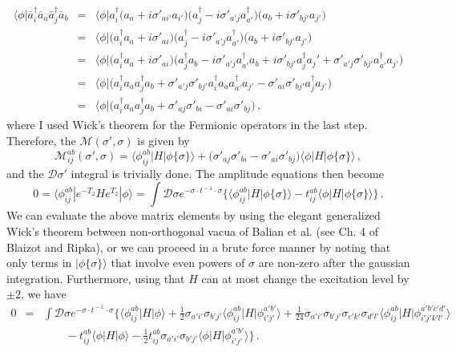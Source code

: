 \documentclass[12pt]{article}
\begin{document}
\begin{eqnarray}
\langle\phi|\bar{a}^{\dagger}_i\bar{a}_a\bar{a}^{\dagger}_j\bar{a}_b &=& \langle\phi|a^{\dagger}_i\bigl(a_a+i\sigma'_{ai'}a_{i'}\bigr)\bigl(a^{\dagger}_j - i\sigma'_{a'j}a^{\dagger}_{a'}\bigr)\bigl(a_b + i\sigma'_{bj'}a_{j'}\bigr)\\
&=& \langle\phi|\bigl(a^{\dagger}_ia_a + i\sigma'_{ai}\bigr)\bigl(a^{\dagger}_j - i\sigma'_{a'j}a^{\dagger}_{a'}\bigr)\bigl(a_b + i\sigma'_{bj'}a_{j'}\bigr)\\
&=& \langle\phi|\bigl(a^{\dagger}_ia_a + i\sigma'_{ai}\bigr)\bigl(a^{\dagger}_ja_b -i\sigma'_{a'j}a^{\dagger}_{a'}a_b + i \sigma'_{bj'}a^{\dagger}_ja_j' + \sigma'_{a'j}\sigma'_{bj'}a^{\dagger}_{a'}a_{j'}\bigr)\nonumber\\
&=&  \langle\phi|\bigl(a^{\dagger}_ia_aa^{\dagger}_ja_b + \sigma'_{a'j}\sigma'_{bj'}a^{\dagger}_ia_aa^{\dagger}_{a'}a_{j'} -\sigma'_{ai}\sigma'_{bj'}a^{\dagger}_{j}a_{j'}\bigr)\\
&=& \langle\phi|\bigl(a^{\dagger}_ia_aa^{\dagger}_ja_b +\sigma'_{aj}\sigma'_{bi}-\sigma'_{ai}\sigma'_{bj}\bigr)\,,
\end{eqnarray}
where I used Wick's theorem for the Fermionic operators in the last step. Therefore, the $\mathcal{M}(\sigma',\sigma)$ is given by
\begin{equation}
\mathcal{M}^{ab}_{ij}(\sigma',\sigma)= \langle\phi^{ab}_{ij}|H|\phi\{\sigma\}\rangle +\bigl(\sigma'_{aj}\sigma'_{bi} -\sigma'_{ai}\sigma'_{bj}\bigr)\langle\phi|H|\phi\{\sigma\}\rangle\,,
\end{equation}
and the $\mathcal{D}\sigma'$ integral is trivially done. The amplitude equations then become
\begin{equation}
\label{eq:AFamp}
0 = \langle\phi^{ab}_{ij}|e^{-T_2}He^{T_2}|\phi\rangle = \int \mathcal{D}\sigma e^{-\sigma\cdot t^{\!-1}\!\cdot\sigma}\biggl\{\langle\phi^{ab}_{ij}|H|\phi\{\sigma\}\rangle  - t^{ab}_{ij}\langle\phi|H|\phi\{\sigma\}\rangle\biggr\}\,.
\end{equation}
We can evaluate the above matrix elements by using the elegant generalized Wick's theorem between non-orthogonal vacua of Balian et al. (see Ch. 4 of Blaizot and Ripka), or we can proceed in a brute force manner by noting that only terms in $|\phi\{\sigma\}\rangle$ that involve even powers of $\sigma$ are non-zero after the gaussian integration. Furthermore, using that $H$ can at most change the excitation level by $\pm 2$, we have
\begin{eqnarray}
0 &=&  \int \mathcal{D}\sigma e^{-\sigma\cdot t^{\!-1}\!\cdot\sigma}\biggl\{\langle\phi^{ab}_{ij}|H|\phi\rangle + \frac{1}{2}\sigma_{a'i'}\sigma_{b'j'}\langle\phi^{ab}_{ij}|H|\phi^{a'b'}_{i'j'}\rangle+\frac{1}{24}\sigma_{a'i'}\sigma_{b'j'}\sigma_{c'k'}\sigma_{d'l'}\langle\phi^{ab}_{ij}|H|\phi^{a'b'c'd'}_{i'j'k'l'}\rangle \nonumber\\ 
&&\qquad-t^{ab}_{ij}\langle\phi|H|\phi\rangle - \frac{1}{2}t^{ab}_{ij}\sigma_{a'i'}\sigma_{b'j'}\langle\phi|H|\phi^{a'b'}_{i'j'}\rangle\biggr\}\,.
\end{eqnarray}
\end{document}
